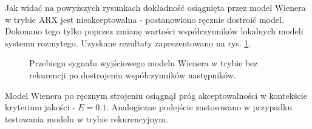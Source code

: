 \documentclass[a4paper,titlepage,11pt,floatssmall]{mwrep}
\begin{document}
Jak widać na powyższych rysunkach dokładność osiągnięta przez model Wienera w trybie ARX jest nieakceptowalna - postanowiono ręcznie dostroić model. Dokonano tego tylko poprzez zmianę wartości współczynników lokalnych modeli systemu rozmytego. Uzyskane rezultaty zaprezentowano na rys. \ref{wien_arx}.

\newpage

\begin{figure}[h!]
\centering
{}
\vfill
{}
\caption{Przebiegu sygnału wyjściowego modelu Wienera w trybie bez rekurencji po dostrojeniu współczynników następników.}
\label{wien_arx}
\end{figure}

Model Wienera po ręcznym strojeniu osiągnął próg akceptowalności w kontekście kryterium jakości - $E = \num{0.1}$. Analogiczne podejście zastosowano w przypadku testowania modelu w trybie rekurencyjnym.

\newpage
\end{document}
